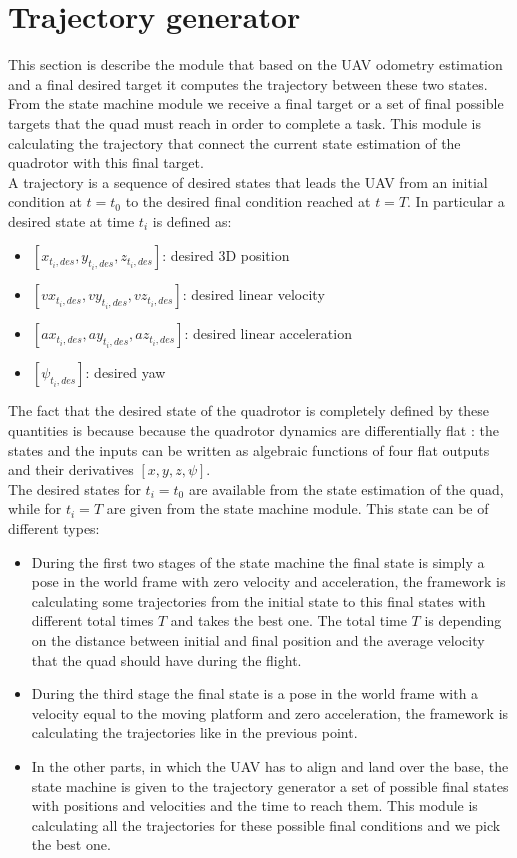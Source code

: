 \chapter{Trajectory generator}\label{chap:trajectory_generator}
This section is describe the module that based on the UAV odometry estimation and a final desired target it computes the trajectory between these two states.\\
From the state machine module we receive a final target or a set of final possible targets that the quad must reach in order to complete a task. This module is calculating the trajectory that connect the current state estimation of the quadrotor with this final target.\\

A trajectory is a sequence of desired states that leads the UAV from an initial condition at $t = t_0 $ to the desired final condition reached at $t = T$. In particular a desired state at time $t_i$ is defined as:
 \begin{itemize}
\item $[x_{t_i,des},y_{t_i,des},z_{t_i,des}]$: desired 3D position
\item $[vx_{t_i,des},vy_{t_i,des},vz_{t_i,des}]$: desired linear velocity
\item $[ax_{t_i,des},ay_{t_i,des},az_{t_i,des}]$: desired linear acceleration
\item $[\psi_{t_i,des}]$: desired yaw
\end{itemize}
The fact that the desired state of the quadrotor is completely defined by these quantities is because because the quadrotor dynamics are differentially flat \cite{van1997real}: the states and the inputs can be written as algebraic functions of four flat outputs and their derivatives $[x,y,z,\psi]$.\\

The desired states for $t_i = t_0$ are available from the state estimation of the quad, while for $t_i = T$ are given from the state machine module. This state can be of different types:
\begin{itemize}
\item During the first two stages of the state machine the final state is simply a pose in the world frame with zero velocity and acceleration, the framework is calculating some trajectories from the initial state to this final states with different total times $T$ and takes the best one. The total time $T$ is depending on the distance between initial and final position and the average velocity that the quad should have during the flight.
\item During the third stage the final state is a pose in the world frame with a velocity equal to the moving platform and zero acceleration, the framework is calculating the trajectories like in the previous point.
\item In the other parts, in which the UAV has to align and land over the base, the state machine is given to the trajectory generator a set of possible final states with positions and velocities and the time to reach them. This module is calculating all the trajectories for these possible final conditions and we pick the best one.
\end{itemize}

